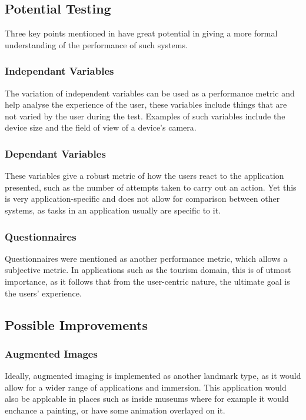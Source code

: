 \subsection{Potential Testing}
Three key points mentioned in \cite{Samini2017} have great potential in giving a more formal understanding of the performance of such systems. 
\subsubsection{Independant Variables}
The variation of independent variables can be used as a performance metric and help analyse the experience of the user, these variables include things that are not 
varied by the user during the test. Examples of such variables include the device size and the field of view of a device's 
camera.\\
\subsubsection{Dependant Variables}
These variables give a robust metric of how the users react to the 
application presented, such as the number of attempts taken to carry out an action.
Yet this is very application-specific and does not allow for comparison between other systems, as 
tasks in an application usually are specific to it.

\subsubsection{Questionnaires}
Questionnaires were mentioned as another performance metric, which allows a subjective metric. 
In applications such as the tourism domain, this is of utmost importance, as it follows that 
from the user-centric nature, the ultimate goal is the users' experience.  

\subsection{Possible Improvements}
\subsubsection{Augmented Images}
Ideally, augmented imaging is implemented as another landmark type, as it would allow for a wider range of applications and immersion.
This application would also be applcable in places such as inside museums where for example it would enchance a painting, or have some animation overlayed on it.

